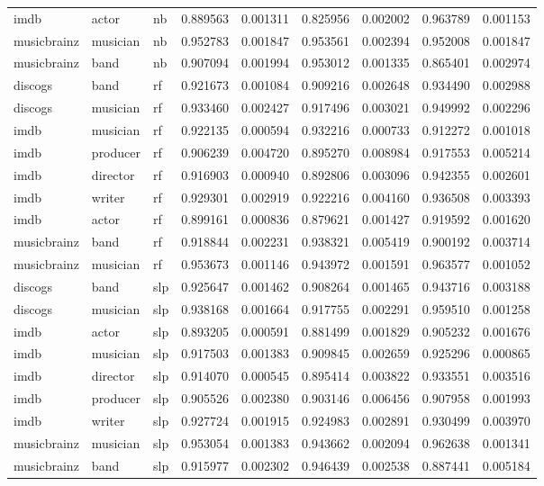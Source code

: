 \documentclass[epsfig,a4paper,11pt,titlepage,twoside,openany]{book}
\begin{document}
\begin{longtable}{|l|l|l|l|l|l|l|l|l|}
imdb        & actor    & nb         & 0.889563 & 0.001311 & 0.825956  & 0.002002 & 0.963789    & 0.001153   \\
musicbrainz & musician & nb         & 0.952783 & 0.001847 & 0.953561  & 0.002394 & 0.952008    & 0.001847   \\
musicbrainz & band     & nb         & 0.907094 & 0.001994 & 0.953012  & 0.001335 & 0.865401    & 0.002974   \\ \hline
discogs     & band     & rf       & 0.921673 & 0.001084 & 0.909216  & 0.002648 & 0.934490    & 0.002988   \\
discogs     & musician & rf       & 0.933460 & 0.002427 & 0.917496  & 0.003021 & 0.949992    & 0.002296   \\
imdb        & musician & rf       & 0.922135 & 0.000594 & 0.932216  & 0.000733 & 0.912272    & 0.001018   \\
imdb        & producer & rf       & 0.906239 & 0.004720 & 0.895270  & 0.008984 & 0.917553    & 0.005214   \\
imdb        & director & rf       & 0.916903 & 0.000940 & 0.892806  & 0.003096 & 0.942355    & 0.002601   \\
imdb        & writer   & rf       & 0.929301 & 0.002919 & 0.922216  & 0.004160 & 0.936508    & 0.003393   \\
imdb        & actor    & rf       & 0.899161 & 0.000836 & 0.879621  & 0.001427 & 0.919592    & 0.001620   \\
musicbrainz & band     & rf       & 0.918844 & 0.002231 & 0.938321  & 0.005419 & 0.900192    & 0.003714   \\
musicbrainz & musician & rf       & 0.953673 & 0.001146 & 0.943972  & 0.001591 & 0.963577    & 0.001052   \\ \hline
discogs     & band     & slp                  & 0.925647 & 0.001462 & 0.908264  & 0.001465 & 0.943716    & 0.003188   \\
discogs     & musician & slp                  & 0.938168 & 0.001664 & 0.917755  & 0.002291 & 0.959510    & 0.001258   \\
imdb        & actor    & slp                  & 0.893205 & 0.000591 & 0.881499  & 0.001829 & 0.905232    & 0.001676   \\
imdb        & musician & slp                  & 0.917503 & 0.001383 & 0.909845  & 0.002659 & 0.925296    & 0.000865   \\
imdb        & director & slp                  & 0.914070 & 0.000545 & 0.895414  & 0.003822 & 0.933551    & 0.003516   \\
imdb        & producer & slp                  & 0.905526 & 0.002380 & 0.903146  & 0.006456 & 0.907958    & 0.001993   \\
imdb        & writer   & slp                  & 0.927724 & 0.001915 & 0.924983  & 0.002891 & 0.930499    & 0.003970   \\
musicbrainz & musician & slp                  & 0.953054 & 0.001383 & 0.943662  & 0.002094 & 0.962638    & 0.001341   \\
musicbrainz & band     & slp                  & 0.915977 & 0.002302 & 0.946439  & 0.002538 & 0.887441    & 0.005184  \\ \hline
\end{longtable}
\end{document}
